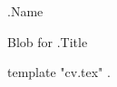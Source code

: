 \documentclass[10pt]{article}
\begin{document}
{{.Name}}

Blob for {{.Title}}

{{template "cv.tex" .}}
\end{document}
